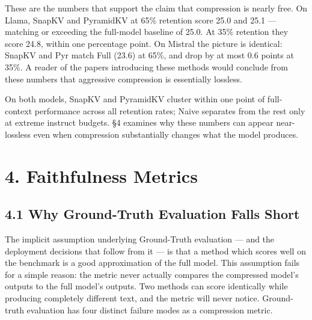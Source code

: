 \documentclass[10pt,letterpaper]{article}
\begin{document}
These are the numbers that support the claim that compression is nearly free.
On Llama, SnapKV and PyramidKV at 65\% retention score 25.0 and 25.1 --- matching
or exceeding the full-model baseline of 25.0. At 35\% retention they score 24.8,
within one percentage point. On Mistral the picture is identical: SnapKV and Pyr
match Full (23.6) at 65\%, and drop by at most 0.6 points at 35\%. A reader of the
papers introducing these methods would conclude from these numbers that aggressive
compression is essentially lossless.

On both models, SnapKV and PyramidKV cluster within one point of full-context
performance across all retention rates; Naive separates from the rest only at extreme
instruct budgets. §4 examines why these numbers can appear near-lossless even when
compression substantially changes what the model produces.

\hypertarget{faithfulness-metrics}{%
\section{4. Faithfulness Metrics}\label{faithfulness-metrics}}

\hypertarget{why-ground-truth-evaluation-falls-short}{%
\subsection{4.1 Why Ground-Truth Evaluation Falls
Short}\label{why-ground-truth-evaluation-falls-short}}

The implicit assumption underlying Ground-Truth evaluation --- and the
deployment decisions that follow from it --- is that a method which
scores well on the benchmark is a good approximation of the full model.
This assumption fails for a simple reason: the metric never actually
compares the compressed model's outputs to the full model's outputs.
Two methods can score identically while producing completely different
text, and the metric will never notice. Ground-truth evaluation has
four distinct failure modes as a compression metric.
\end{document}
